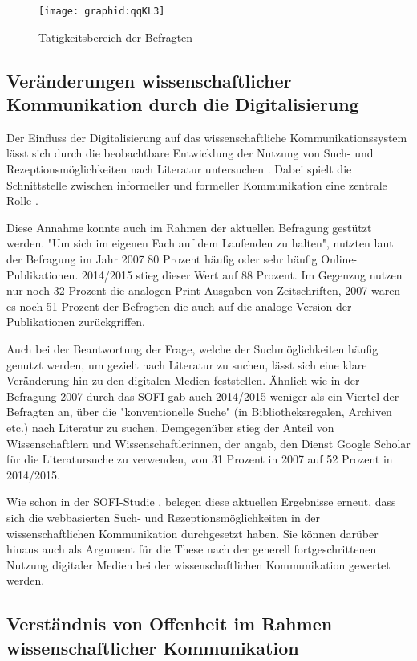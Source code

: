 \begin{figure}[h!]
\texttt{[image: graphid:qqKL3]}
\caption{Tatigkeitsbereich der Befragten}
\end{figure}

\subsection{Veränderungen wissenschaftlicher Kommunikation durch die Digitalisierung}

Der Einfluss der Digitalisierung auf das wissenschaftliche Kommunikationssystem lässt sich durch die beobachtbare Entwicklung der Nutzung von Such- und Rezeptionsmöglichkeiten nach Literatur untersuchen \cite{Hanekop_2014}. Dabei spielt die Schnittstelle zwischen informeller und formeller Kommunikation eine zentrale Rolle \cite{Hanekop_2014}.

Diese Annahme konnte auch im Rahmen der aktuellen Befragung gestützt werden. "Um sich im eigenen Fach auf dem Laufenden zu halten", nutzten laut der Befragung im Jahr 2007 80 Prozent häufig oder sehr häufig Online-Publikationen. 2014/2015 stieg dieser Wert auf 88 Prozent. Im Gegenzug nutzen nur noch 32 Prozent die analogen Print-Ausgaben von Zeitschriften, 2007 waren es noch 51 Prozent der Befragten die auch auf die analoge Version der Publikationen zurückgriffen.

Auch bei der Beantwortung der Frage, welche der Suchmöglichkeiten häufig genutzt werden, um gezielt nach Literatur zu suchen, lässt sich eine klare Veränderung hin zu den digitalen Medien feststellen. Ähnlich wie in der Befragung 2007 durch das SOFI gab auch 2014/2015 weniger als ein Viertel der Befragten an, über die "konventionelle Suche" (in Bibliotheksregalen, Archiven etc.) nach Literatur zu suchen. Demgegenüber stieg der Anteil von Wissenschaftlern und Wissenschaftlerinnen, der angab, den Dienst Google Scholar für die Literatursuche zu verwenden, von 31 Prozent in 2007 auf 52 Prozent in 2014/2015.

Wie schon in der SOFI-Studie \cite{Hanekop_2014}, belegen diese aktuellen Ergebnisse erneut, dass sich die webbasierten Such- und Rezeptionsmöglichkeiten in der wissenschaftlichen Kommunikation durchgesetzt haben. Sie können darüber hinaus auch als Argument für die These nach der generell fortgeschrittenen Nutzung digitaler Medien bei der wissenschaftlichen Kommunikation gewertet werden.

\subsection{Verständnis von Offenheit im Rahmen wissenschaftlicher Kommunikation}

